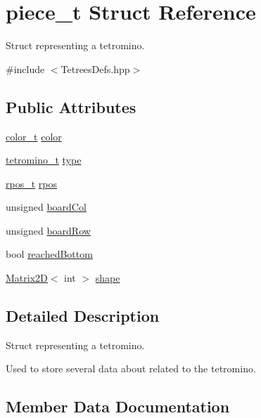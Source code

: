 \hypertarget{structpiece__t}{}\section{piece\+\_\+t Struct Reference}
\label{structpiece__t}


Struct representing a tetromino.  




{\ttfamily \#include $<$Tetrees\+Defs.\+hpp$>$}

\subsection*{Public Attributes}
\begin{DoxyCompactItemize}
\item 
\mbox{\hyperlink{TetreesDefs_8hpp_a8ba5fbce2446135735693ab60c896bbd}{color\+\_\+t}} \mbox{\hyperlink{structpiece__t_af6408bda8899430d6457a83afb657225}{color}}
\item 
\mbox{\hyperlink{TetreesDefs_8hpp_acd279a62a49ecee418dd808ac39a1795}{tetromino\+\_\+t}} \mbox{\hyperlink{structpiece__t_ac5cbbdb5ff335128af8ca9f491a4f543}{type}}
\item 
\mbox{\hyperlink{TetreesDefs_8hpp_ae8c3bf9765f183eabf1106110513afc6}{rpos\+\_\+t}} \mbox{\hyperlink{structpiece__t_ab1d715c35231b557560096e2d79f4a43}{rpos}}
\item 
unsigned \mbox{\hyperlink{structpiece__t_a1556aab0120dd987a1e679fe13864b2e}{board\+Col}}
\item 
unsigned \mbox{\hyperlink{structpiece__t_a14640fd68c44e80eacbe6adbf8597829}{board\+Row}}
\item 
bool \mbox{\hyperlink{structpiece__t_acb67c9322e157b7dd7c7e0efd212da76}{reached\+Bottom}}
\item 
\mbox{\hyperlink{classMatrix2D}{Matrix2D}}$<$ int $>$ \mbox{\hyperlink{structpiece__t_a3c8f9c2e51c6bab728e564143c439746}{shape}}
\end{DoxyCompactItemize}


\subsection{Detailed Description}
Struct representing a tetromino. 

Used to store several data about related to the tetromino. 

\subsection{Member Data Documentation}
\mbox{\label{structpiece__t_a1556aab0120dd987a1e679fe13864b2e}} 
